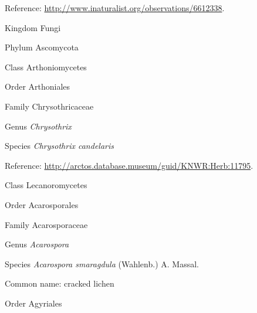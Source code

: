 \documentclass[9pt, article]{memoir}
\begin{document}
\begin{multicols}{2}
Reference: 
\url{http://www.inaturalist.org/observations/6612338}.

\vspace{6pt}\noindent\hspace{0pt}Kingdom Fungi


\vspace{6pt}\noindent\hspace{6pt}Phylum Ascomycota


\vspace{6pt}\noindent\hspace{12pt}Class Arthoniomycetes


\vspace{6pt}\noindent\hspace{18pt}Order Arthoniales


\vspace{6pt}\noindent\hspace{24pt}Family Chrysothricaceae


\vspace{6pt}\noindent\hspace{30pt}Genus \textit{Chrysothrix}


\vspace{6pt}\noindent\hspace{36pt}Species \textit{Chrysothrix candelaris}


Reference: 
\url{http://arctos.database.museum/guid/KNWR:Herb:11795}.

\vspace{6pt}\noindent\hspace{12pt}Class Lecanoromycetes


\vspace{6pt}\noindent\hspace{18pt}Order Acarosporales


\vspace{6pt}\noindent\hspace{24pt}Family Acarosporaceae


\vspace{6pt}\noindent\hspace{30pt}Genus \textit{Acarospora}


\vspace{6pt}\noindent\hspace{36pt}Species \textit{Acarospora smaragdula} (Wahlenb.) A. Massal.


Common name: cracked lichen

\vspace{6pt}\noindent\hspace{18pt}Order Agyriales



\end{multicols}
\end{document}
